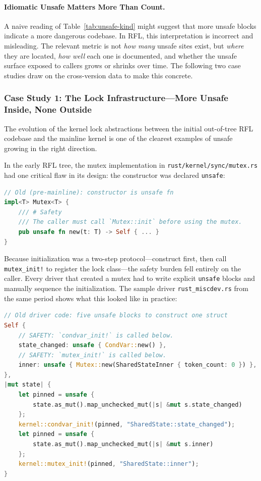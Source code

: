 \paragraph{Idiomatic Unsafe Matters More Than Count.}
A naive reading of Table~\ref{tab:unsafe-kind} might suggest that more unsafe blocks indicate a more dangerous codebase.
In RFL, this interpretation is incorrect and misleading.
The relevant metric is not \emph{how many} unsafe sites exist, but \emph{where} they are located, \emph{how well} each one is documented, and whether the unsafe surface exposed to callers grows or shrinks over time.
The following two case studies draw on the cross-version data to make this concrete.

\subsubsection{Case Study 1: The Lock Infrastructure---More Unsafe Inside, None Outside}

The evolution of the kernel lock abstractions between the initial out-of-tree RFL codebase and the mainline kernel is one of the clearest examples of unsafe growing in the right direction.

In the early RFL tree, the mutex implementation in \texttt{rust/kernel/sync/mutex.rs} had one critical flaw in its design: the constructor was declared \texttt{unsafe}:

\begin{lstlisting}[language=Rust,columns=fullflexible]
// Old (pre-mainline): constructor is unsafe fn
impl<T> Mutex<T> {
    /// # Safety
    /// The caller must call `Mutex::init` before using the mutex.
    pub unsafe fn new(t: T) -> Self { ... }
}
\end{lstlisting}

\noindent Because initialization was a two-step protocol---construct first, then call \texttt{mutex\_init!} to register the lock class---the safety burden fell entirely on the caller.
Every driver that created a mutex had to write explicit \texttt{unsafe} blocks and manually sequence the initialization.
The sample driver \texttt{rust\_miscdev.rs} from the same period shows what this looked like in practice:

\begin{lstlisting}[language=Rust,columns=fullflexible]
// Old driver code: five unsafe blocks to construct one struct
Self {
    // SAFETY: `condvar_init!` is called below.
    state_changed: unsafe { CondVar::new() },
    // SAFETY: `mutex_init!` is called below.
    inner: unsafe { Mutex::new(SharedStateInner { token_count: 0 }) },
},
|mut state| {
    let pinned = unsafe {
        state.as_mut().map_unchecked_mut(|s| &mut s.state_changed)
    };
    kernel::condvar_init!(pinned, "SharedState::state_changed");
    let pinned = unsafe {
        state.as_mut().map_unchecked_mut(|s| &mut s.inner)
    };
    kernel::mutex_init!(pinned, "SharedState::inner");
}
\end{lstlisting}

